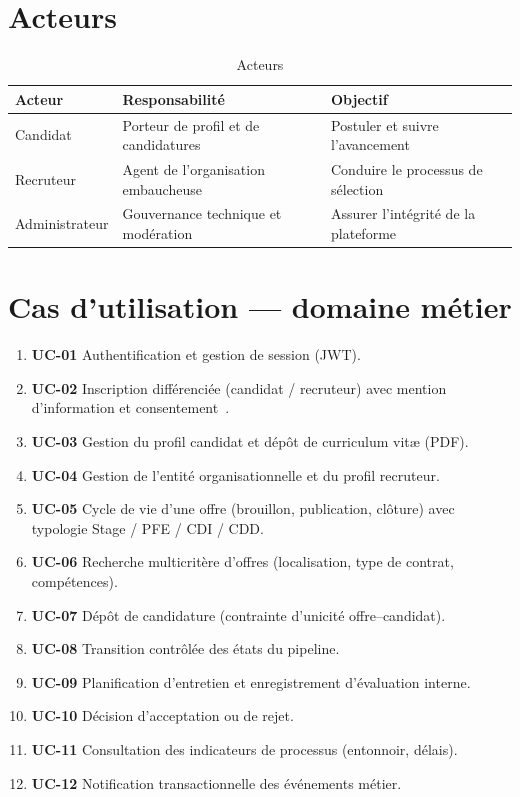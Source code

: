 \documentclass[12pt,a4paper,oneside]{report}
\begin{document}
\section{Acteurs}

\begin{table}[H]
\centering
\caption{Acteurs}
\begin{tabular}{@{}lll@{}}
\toprule
\textbf{Acteur} & \textbf{Responsabilité} & \textbf{Objectif} \\
\midrule
Candidat & Porteur de profil et de candidatures & Postuler et suivre l'avancement \\
Recruteur & Agent de l'organisation embaucheuse & Conduire le processus de sélection \\
Administrateur & Gouvernance technique et modération & Assurer l'intégrité de la plateforme \\
\bottomrule
\end{tabular}
\end{table}

\section{Cas d'utilisation --- domaine métier}

\begin{enumerate}[leftmargin=1.3em]
  \item \textbf{UC-01} Authentification et gestion de session (JWT).
  \item \textbf{UC-02} Inscription différenciée (candidat / recruteur) avec mention d'information et consentement~\cite{loi0908}.
  \item \textbf{UC-03} Gestion du profil candidat et dépôt de curriculum vitæ (PDF).
  \item \textbf{UC-04} Gestion de l'entité organisationnelle et du profil recruteur.
  \item \textbf{UC-05} Cycle de vie d'une offre (brouillon, publication, clôture) avec typologie Stage / PFE / CDI / CDD.
  \item \textbf{UC-06} Recherche multicritère d'offres (localisation, type de contrat, compétences).
  \item \textbf{UC-07} Dépôt de candidature (contrainte d'unicité offre--candidat).
  \item \textbf{UC-08} Transition contrôlée des états du pipeline.
  \item \textbf{UC-09} Planification d'entretien et enregistrement d'évaluation interne.
  \item \textbf{UC-10} Décision d'acceptation ou de rejet.
  \item \textbf{UC-11} Consultation des indicateurs de processus (entonnoir, délais).
  \item \textbf{UC-12} Notification transactionnelle des événements métier.
\end{enumerate}
\end{document}

